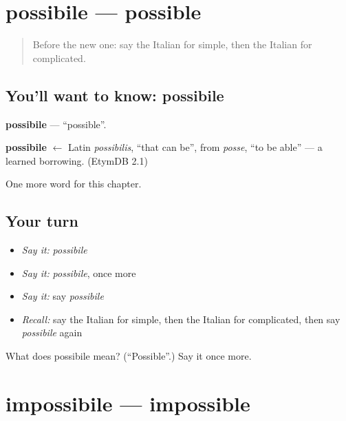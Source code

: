 \section[possibile]{possibile — possible}

\label{lesson:IT-C157-possibile}



\begin{quote}
Before the new one: say the Italian for simple, then the Italian for complicated.
\end{quote}

\subsection*{You'll want to know: possibile}
\textbf{possibile} — \textquotedblleft{}possible\textquotedblright{}.

\begin{cousinweb}
\textbf{possibile} $\leftarrow$ Latin \emph{possibilis}, \textquotedblleft{}that can be\textquotedblright{}, from \emph{posse}, \textquotedblleft{}to be able\textquotedblright{} — a learned borrowing. (EtymDB 2.1)
\end{cousinweb}

\begin{grammarlens}[title={What you've built}]
One more word for this chapter.
\end{grammarlens}

\subsection*{Your turn}
\begin{itemize}
\raggedright
  \item \emph{Say it:} \emph{possibile}
  \item \emph{Say it:} \emph{possibile}, once more
  \item \emph{Say it:} say \emph{possibile}
  \item \emph{Recall:} say the Italian for simple, then the Italian for complicated, then say \emph{possibile} again
\end{itemize}

\begin{tcolorbox}[breakable,colback=teal!4,colframe=teal!35!black,title={Before you move on}]
What does possibile mean? (\textquotedblleft{}Possible\textquotedblright{}.) Say it once more.
\end{tcolorbox}
\section[impossibile]{impossibile — impossible}

